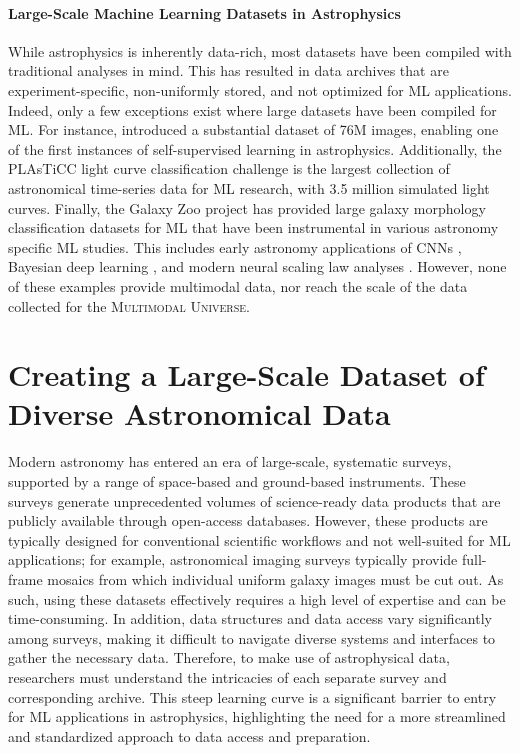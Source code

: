 \documentclass[dvipsnames,table]{article}
\newcommand\pile{\textsc{Multimodal Universe}\xspace}
\begin{document}
\paragraph{Large-Scale Machine Learning Datasets in Astrophysics} While astrophysics is inherently data-rich, most datasets have been compiled with traditional analyses in mind. This has resulted in data archives that are experiment-specific, non-uniformly stored, and not optimized for ML applications. Indeed, only a few exceptions exist where large datasets have been compiled for ML. For instance, \citep{Stein2021, Stein2022} introduced a substantial dataset of 76M images, enabling one of the first instances of self-supervised learning in astrophysics. Additionally, the PLAsTiCC \citep{PLAsTiCC_2018} light curve classification challenge is the largest collection of astronomical time-series data for ML research, with 3.5 million simulated light curves. Finally, the Galaxy Zoo project has provided large galaxy morphology classification datasets for ML \citep{gzchallengeKaggle2013, Walmsley2023GZDESI} that have been instrumental in various astronomy specific ML studies. This includes early astronomy applications of CNNs \citep{Dielman2015GZCNN}, Bayesian deep learning \citep{Walmsley2019BNN}, and modern neural scaling law analyses \citep{walmsley2024scaling,astropt}. However, none of these examples provide multimodal data, nor reach the scale of the data collected for the \pile.


\section{Creating a Large-Scale Dataset of Diverse Astronomical Data}

Modern astronomy has entered an era of large-scale, systematic surveys, supported by a range of space-based and ground-based instruments. These surveys generate unprecedented volumes of science-ready data products that are publicly available through open-access databases. However, these products are typically designed for conventional scientific workflows and not well-suited for ML applications; for example, astronomical imaging surveys typically provide full-frame mosaics from which individual uniform galaxy images must be cut out. As such, using these datasets effectively requires a high level of expertise and can be time-consuming. In addition, data structures and data access vary significantly among surveys, making it difficult to navigate diverse systems and interfaces to gather the necessary data. Therefore, to make use of astrophysical data, researchers must understand the intricacies of each separate survey and corresponding archive. This steep learning curve is a significant barrier to entry for ML applications in astrophysics, highlighting the need for a more streamlined and standardized approach to data access and preparation.
\end{document}

